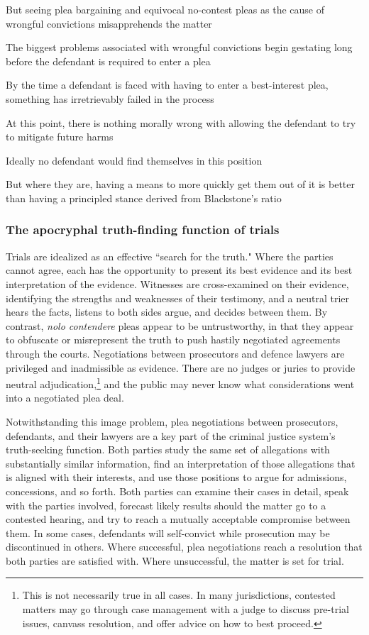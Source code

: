 But seeing plea bargaining and equivocal no-contest pleas as the cause of wrongful convictions misapprehends the matter

The biggest problems associated with wrongful convictions begin gestating long before the defendant is required to enter a plea

By the time a defendant is faced with having to enter a best-interest plea, something has irretrievably failed in the process

At this point, there is nothing morally wrong with allowing the defendant to try to mitigate future harms

Ideally no defendant would find themselves in this position

But where they are, having a means to more quickly get them out of it is better than having a principled stance derived from Blackstone's ratio

\subsubsection{The apocryphal truth-finding function of trials}

Trials are idealized as an effective ``search for the truth." Where the parties cannot agree, each has the opportunity to present its best evidence and its best interpretation of the evidence. Witnesses are cross-examined on their evidence, identifying the strengths and weaknesses of their testimony, and a neutral trier hears the facts, listens to both sides argue, and decides between them. By contrast, \textit{nolo contendere} pleas appear to be untrustworthy, in that they appear to obfuscate or misrepresent the truth to push hastily negotiated agreements through the courts. Negotiations between prosecutors and defence lawyers are privileged and inadmissible as evidence. There are no judges or juries to provide neutral adjudication,\footnote{This is not necessarily true in all cases. In many jurisdictions, contested matters may go through case management with a judge to discuss pre-trial issues, canvass resolution, and offer advice on how to best proceed.} and the public may never know what considerations went into a negotiated plea deal. 

Notwithstanding this image problem, plea negotiations between prosecutors, defendants, and their lawyers are a key part of the criminal justice system's truth-seeking function. Both parties study the same set of allegations with substantially similar information, find an interpretation of those allegations that is aligned with their interests, and use those positions to argue for admissions, concessions, and so forth. Both parties can examine their cases in detail, speak with the parties involved, forecast likely results should the matter go to a contested hearing, and try to reach a mutually acceptable compromise between them. In some cases, defendants will self-convict while prosecution may be discontinued in others. Where successful, plea negotiations reach a resolution that both parties are satisfied with. Where unsuccessful, the matter is set for trial.

